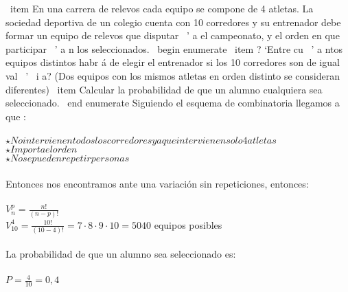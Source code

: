 \problem
\ item   En una carrera de relevos cada equipo se compone de 4 atletas. La
sociedad deportiva de un colegio cuenta con 10 corredores y su
entrenador debe formar un equipo de relevos que disputar { \ ' a} el campeonato,
y el orden en que participar { \ ' a} n los seleccionados.
\ begin { enumerate }
\ item ? `Entre cu { \ ' a} ntos equipos distintos habr { \' a} de elegir el entrenador si los
10 corredores son de igual val { \ ' \ i } a? (Dos equipos con los mismos atletas en
orden distinto se consideran diferentes)
\ item Calcular la probabilidad de que un alumno cualquiera sea
seleccionado.
\ end { enumerate }	
\subproblem
Siguiendo el esquema de combinatoria llegamos a que : \\ \\
$ \star No intervienen todos los corredores ya que intervienen solo 4 atletas  $ \\
$ \star Importa el orden  $ \\
$ \star No se pueden repetir personas  $ \\ \\
Entonces nos encontramos ante una variación sin repeticiones, entonces: \\ \\
$V^{p}_{n} = \frac{n!}{(n-p)!}$\\ 
$V^{4}_{10} = \frac{10!}{(10-4)!} = 7\cdot8\cdot9\cdot10 = 5040$ equipos posibles\\ \\
	
\subproblem
La probabilidad de que un alumno sea seleccionado es: \\ \\
$P = \frac{4}{10} = 0,4$
